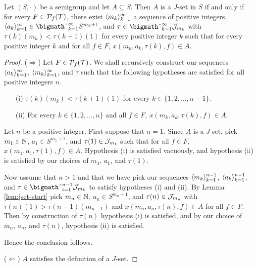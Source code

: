 \begin{lem}
  \label{lem:many}
  Let $(S, \cdot)$ be a semigroup and let $A \subseteq S$.
  Then $A$ is a $J$-set in $S$ if and only if for every $F \in \mathcal{P}_f(\mathcal{T})$, there exist $\langle m_k \rangle_{k=1}^\infty$ a sequence of positive integers, $\la a_k \ra_{k=1}^\infty \in \bigtimes_{k=1}^\infty S^{m_k+1}$, and $\tau \in \bigtimes_{k=1}^\infty \calJ_{m_k}$ with $\tau(k)(m_k) < \tau(k+1)(1)$ for every positive integer $k$ such that for every positive integer $k$ and for all $f \in F$, $x(m_k, a_k, \tau(k), f) \in A$.
\end{lem}
\begin{proof}
  ($\Rightarrow$)
  Let $F \in \mathcal{P}_f(\mathcal{T})$.
  We shall recursively construct our sequences $\langle a_k \rangle_{k=1}^\infty$, $\langle m_k \rangle_{k=1}^\infty$, and $\tau$ such that the following hypotheses are satisfied for all positive integers $n$. 
  \begin{itemize}
    \item[(i)]
      $\tau(k)(m_k) < \tau(k+1)(1)$ for every $k \in \{1, 2, \ldots, n-1\}$.

    \item[(ii)]
      For every $k \in \{1, 2, \ldots, n\}$ and all $f \in F$, $x(m_k, a_k, \tau(k), f) \in A$.
  \end{itemize}
  
  Let $n$ be a positive integer.
  First suppose that $n = 1$. 
  Since $A$ is a $J$-set, pick $m_1 \in \mathbb{N}$, $a_1 \in S^{m_1+1}$, and $\tau(1) \in \mathcal{J}_{m_1}$ such that for all $f \in F$, $x(m_1, a_1, \tau(1), f) \in A$. 
  Hypothesis (i) is satisfied vacuously, and hypothesis (ii) is satisfied by our choices of $m_1$, $a_1$, and $\tau(1)$. 

  Now assume that $n > 1$ and that we have pick our sequences $\langle m_k \rangle_{k=1}^{n-1}$, $\langle a_k \rangle_{k=1}^{n-1}$, and $\tau \in \bigtimes_{i=1}^{n-1} \calJ_{m_k}$ to satisfy hypotheses (i) and (ii). 
  By Lemma \ref{lem:jset-start} pick $m_n \in \mathbb{N}$, $a_n \in S^{m_n+1}$, and $\tau(n) \in \mathcal{J}_{m_n}$ with $\tau(n)(1) > \tau(n-1)(m_{n-1})$ and $x(m_n, a_n, \tau(n), f) \in A$ for all $f \in F$. 
  Then by construction of $\tau(n)$ hypothesis (i) is satisfied, and by our choice of $m_n$, $a_n$, and $\tau(n)$, hypothesis (ii) is satisfied. 

  Hence the conclusion follows. 

  ($\Leftarrow$)
  $A$ satisfies the definition of a $J$-set.
\end{proof}

